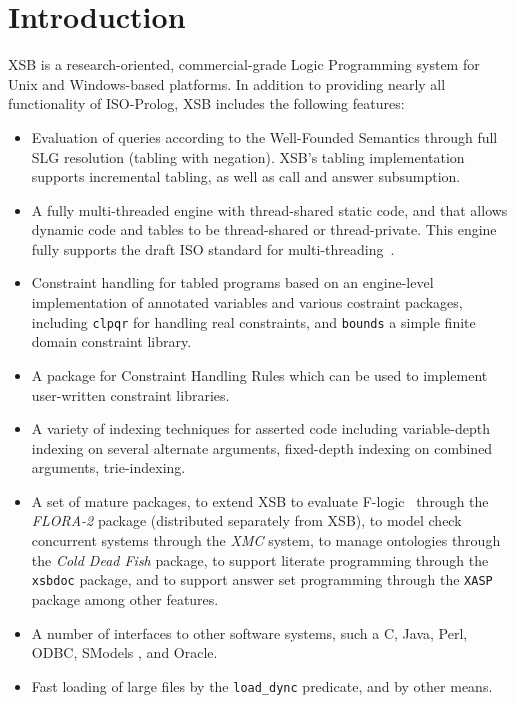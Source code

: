 \chapter{Introduction} \label{introduction}

XSB is a research-oriented, commercial-grade Logic Programming system
for Unix and Windows-based platforms.  In addition to providing nearly
all functionality of ISO-Prolog, XSB includes the following features:
\begin{itemize}
%
\item Evaluation of queries according to the Well-Founded Semantics
  \cite{VGRS91} through full SLG resolution (tabling with negation).
  XSB's tabling implementation supports incremental tabling, as well
  as call and answer subsumption.
%
\item A fully multi-threaded engine with thread-shared static code,
  and that allows dynamic code and tables to be thread-shared or
  thread-private.  This engine fully supports the draft ISO standard
  for multi-threading~\cite{Prolog-MT-ISO}.
%
\item Constraint handling for tabled programs based on an engine-level
  implementation of annotated variables and various costraint
  packages, including {\tt clpqr} for handling real constraints, and
  {\tt bounds} a simple finite domain constraint library.
%
  \item A package for Constraint Handling Rules \cite{Fruh} which can be
    used to implement user-written constraint libraries.
% 
\item A variety of indexing techniques for asserted code 
  including variable-depth indexing on several alternate arguments,
  fixed-depth indexing on combined arguments, trie-indexing.
%
\item A set of mature packages, to extend XSB to evaluate
  F-logic~\cite{KLW95} through the {\em FLORA-2} package (distributed
  separately from XSB), to model check concurrent systems through the
  {\em XMC} system, to manage ontologies through the {\em Cold Dead
    Fish} package, to support literate programming through the {\tt
    xsbdoc} package, and to support answer set programming through the
  {\tt XASP} package among other features.
%
\item A number of interfaces to other software systems, such a C, Java,
  Perl, ODBC, SModels \cite{NiSi97}, and Oracle.
%
\item Fast loading of large files by the {\tt load\_dync}
  predicate, and by other means.

\end{itemize}
